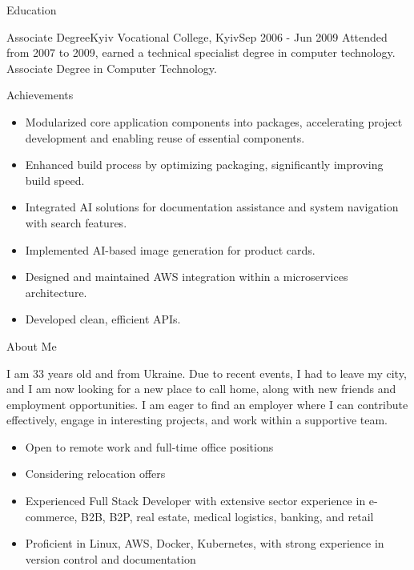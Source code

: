 \documentclass[]{mcdowellcv}
\begin{document}
\begin{cvsection}{Education}
    \begin{cvsubsection}{Associate Degree}{Kyiv Vocational College, Kyiv}{Sep 2006 - Jun 2009}
        Attended from 2007 to 2009, earned a technical specialist degree in computer technology. Associate Degree in Computer Technology.
    \end{cvsubsection}
\end{cvsection}

\begin{cvsection}{Achievements}
    \begin{cvsubsection}{}{}{}
        \begin{itemize}
            \item Modularized core application components into packages, accelerating project development and enabling reuse of essential components.
            \item Enhanced build process by optimizing packaging, significantly improving build speed.
            \item Integrated AI solutions for documentation assistance and system navigation with search features.
            \item Implemented AI-based image generation for product cards.
            \item Designed and maintained AWS integration within a microservices architecture.
            \item Developed clean, efficient APIs.
        \end{itemize}
    \end{cvsubsection}
\end{cvsection}

\begin{cvsection}{About Me}
    \begin{cvsubsection}{}{}{}
        I am 33 years old and from Ukraine. Due to recent events, I had to leave my city, and I am now looking for a new place to call home, along with new friends and employment opportunities. I am eager to find an employer where I can contribute effectively, engage in interesting projects, and work within a supportive team.
        
        \begin{itemize}
            \item Open to remote work and full-time office positions
            \item Considering relocation offers
            \item Experienced Full Stack Developer with extensive sector experience in e-commerce, B2B, B2P, real estate, medical logistics, banking, and retail
            \item Proficient in Linux, AWS, Docker, Kubernetes, with strong experience in version control and documentation
        \end{itemize}
    \end{cvsubsection}
\end{cvsection}
\end{document}
